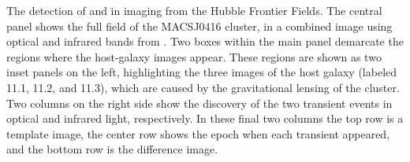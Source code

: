 \label{fig:SpockDetectionImages}
The detection of \spockone and \spocktwo in \HST imaging from the
Hubble Frontier Fields. The central panel shows the full field of the
MACSJ0416 cluster, in a combined image using optical and infrared
bands from \HST.  Two boxes within the main panel demarcate the regions
where the \spock host-galaxy images appear. These regions are shown as
two inset panels on the left, highlighting the three images of the
host galaxy (labeled 11.1, 11.2, and 11.3), which are caused by the
gravitational lensing of the cluster.  Two columns on the right side
show the discovery of the two transient events in optical and infrared
light, respectively.  In these final two columns the top row is a
template image, the center row shows the epoch when each transient
appeared, and the bottom row is the difference image.

